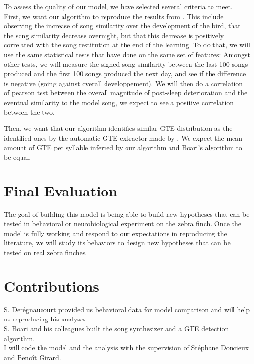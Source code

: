 \documentclass[a4paper]{article}
\begin{document}
\begin{multicols}{1}
To assess the quality of our model, we have selected several criteria to meet.
First, we want our algorithm to reproduce the results from
\textcite{deregnaucourt_how_2005}. This include observing the increase of song
similarity \parencite{tchernichovski_procedure_2000} over the development of the
bird, that the song similarity decrease overnight, but that this decrease is
positively correlated with the song restitution at the end of the learning. To
do that, we will use the same statistical tests that
\textcite{deregnaucourt_how_2005} have done on the same set of features: Amongst
other tests, we will measure the signed song similarity between the last 100
songs produced and the first 100 songs produced the next day, and see if the
difference is negative (going against overall developpement). We will then do a
correlation of pearson test between the overall magnitude of post-sleep
deterioration and the eventual similarity to the model song, we expect to see a
positive correlation between the two.

Then, we want that our algorithm identifies similar GTE distribution as the
identified ones by the automatic GTE extractor made by
\textcite{boari_automatic_2015}. We expect the mean amount of GTE per syllable
inferred by our algorithm and Boari's algorithm to be equal.

\section*{Final Evaluation}

The goal of building this model is being able to build new hypotheses that can
be tested in behavioral or neurobiological experiment on the zebra finch. Once
the model is fully working and respond to our expectations in reproducing the
literature, we will study its behaviors to design new hypotheses that can
be tested on real zebra finches.

\section*{Contributions}

S. Derégnaucourt provided us behavioral data for model comparison and will help
us reproducing his analyses.\\
S. Boari and his colleagues built the song synthesizer and a GTE detection
algorithm.\\
I will code the model and the analysis with the supervision of Stéphane Doncieux
and Benoît Girard.\\

\printbibliography{}

\end{multicols}
\end{document}
